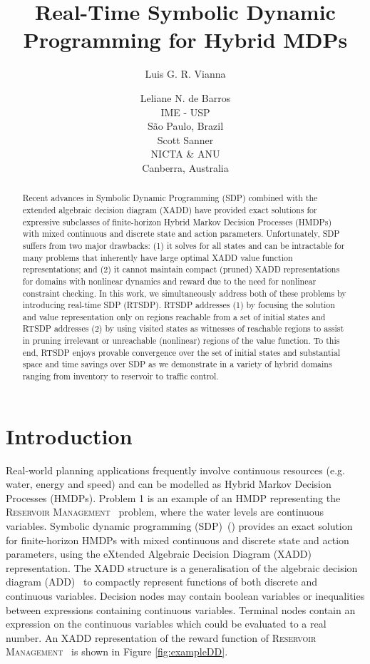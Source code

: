 \documentclass[letterpaper]{article}
\title{Real-Time Symbolic Dynamic Programming for Hybrid MDPs}
\author{
Luis G. R. Vianna \and Leliane N. de Barros\\
IME - USP\\
S\~ao Paulo, Brazil\\
\And
Scott Sanner\\
NICTA \& ANU\\
Canberra, Australia}
\newcommand{\Reservoir}{\textsc{Reservoir Management}}
\begin{document}
\maketitle

\begin{abstract}
Recent advances in Symbolic Dynamic Programming (SDP) combined with
the extended algebraic decision diagram (XADD) have provided exact
solutions for expressive subclasses of finite-horizon Hybrid Markov
Decision Processes (HMDPs) with mixed continuous and discrete state
and action parameters.  Unfortunately, SDP suffers from two major
drawbacks: (1) it solves for all states and can be intractable for
many problems that inherently have large optimal XADD value function
representations; and (2) it cannot maintain compact (pruned) XADD
representations for domains with nonlinear dynamics and reward due to
the need for nonlinear constraint checking.  In this work, we
simultaneously address both of these problems by introducing real-time
SDP (RTSDP).  RTSDP addresses (1) by focusing the solution and value
representation only on regions reachable from a set of initial states
and RTSDP addresses (2) by using visited states as witnesses of
reachable regions to assist in pruning irrelevant or unreachable
(nonlinear) regions of the value function.  To this end, RTSDP enjoys
provable convergence over the set of initial states and substantial
space and time savings over SDP as we demonstrate in a variety of 
hybrid domains ranging from inventory to reservoir to traffic control.
\end{abstract}

\section{Introduction}

Real-world planning applications frequently involve continuous resources (e.g. water, energy and speed) and can be modelled as Hybrid Markov Decision Processes (HMDPs). Problem 1 is an example of an HMDP representing the \Reservoir~ problem, where the water levels are continuous variables.
Symbolic dynamic programming (SDP)~(\cite{zamani12}) provides an exact solution for finite-horizon HMDPs with mixed continuous and discrete state and action parameters, using the eXtended Algebraic Decision Diagram (XADD) representation.
The XADD structure is a generalisation of the algebraic decision diagram (ADD)~\cite{bahar93add} to compactly represent functions of both discrete and continuous variables.
Decision nodes may contain boolean variables or inequalities between expressions containing continuous variables.
Terminal nodes contain an expression on the continuous variables which could be evaluated to a real number.
An XADD representation of the reward function of \Reservoir~ is shown in Figure \ref{fig:exampleDD}.
\end{document}
